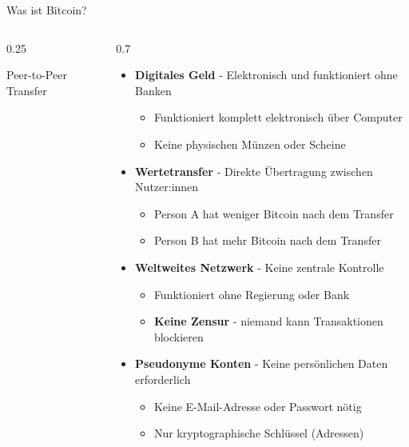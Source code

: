 \documentclass[aspectratio=169,t,11pt]{beamer}
\begin{document}
\begin{frame}{Was ist Bitcoin?}
	\begin{columns}[T]
		\begin{column}{0.25\textwidth}
			\centering
			\vspace{0.3cm}

			{\small Peer-to-Peer Transfer}
		\end{column}

		\begin{column}{0.7\textwidth}
			\begin{itemize}
				\item \textbf{Digitales Geld} - Elektronisch und funktioniert ohne Banken
				      \begin{itemize}
					      \item Funktioniert komplett elektronisch über Computer
					      \item Keine physischen Münzen oder Scheine
				      \end{itemize}
				\item \textbf{Wertetransfer} - Direkte Übertragung zwischen Nutzer:innen
				      \begin{itemize}
					      \item Person A hat weniger Bitcoin nach dem Transfer
					      \item Person B hat mehr Bitcoin nach dem Transfer
				      \end{itemize}
				\item \textbf{Weltweites Netzwerk} - Keine zentrale Kontrolle
				      \begin{itemize}
					      \item Funktioniert ohne Regierung oder Bank
					      \item \textbf{Keine Zensur} - niemand kann Transaktionen blockieren
				      \end{itemize}
				\item \textbf{Pseudonyme Konten} - Keine persönlichen Daten erforderlich
				      \begin{itemize}
					      \item Keine E-Mail-Adresse oder Passwort nötig
					      \item Nur kryptographische Schlüssel (Adressen)
				      \end{itemize}
			\end{itemize}
		\end{column}
	\end{columns}
\end{frame}
\end{document}

